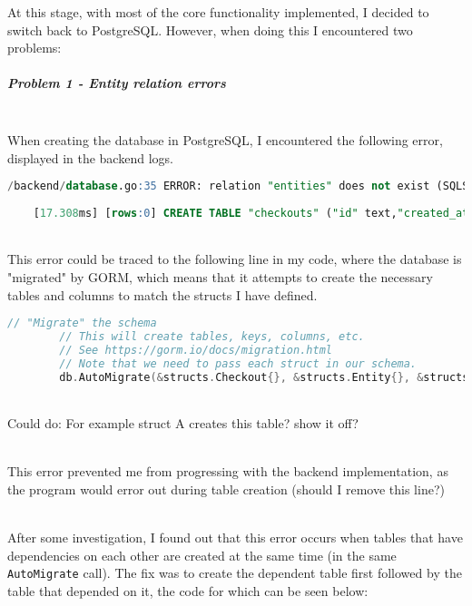 \documentclass[../../main.tex]{subfiles}
\begin{document}
\noindent At this stage, with most of the core functionality implemented, I decided to switch back to PostgreSQL. However, when doing this I encountered two problems:

\subparagraph{Problem 1 - Entity relation errors}

\noindent \\ When creating the database in PostgreSQL, I encountered the following error, displayed in the backend logs.

\begin{lstlisting}[language=SQL]
    /backend/database.go:35 ERROR: relation "entities" does not exist (SQLSTATE 42P01)
    
    [17.308ms] [rows:0] CREATE TABLE "checkouts" ("id" text,"created_at" timestamptz,"updated_at" timestamptz,"deleted_at" timestamptz,"take_date" timestamptz,"return_date" timestamptz,PRIMARY KEY ("id"),CONSTRAINT "fk_entities_checkouts" FOREIGN KEY ("id") REFERENCES "entities"("id"))
    \end{lstlisting}

\noindent \\ This error could be traced to the following line in my code, where the database is "migrated" by GORM, which means that it attempts to create the necessary tables and columns to match the structs I have defined.

\begin{lstlisting}[language=Go]
        // "Migrate" the schema
        // This will create tables, keys, columns, etc.
        // See https://gorm.io/docs/migration.html
        // Note that we need to pass each struct in our schema.
        db.AutoMigrate(&structs.Checkout{}, &structs.Entity{}, &structs.Item{}, &structs.User{})
    \end{lstlisting}

\noindent \\Could do: For example struct A creates this table? show it off?

\noindent \\ This error prevented me from progressing with the backend implementation, as the program would error out during table creation (should I remove this line?)

\noindent \\ After some investigation, I found out that this error occurs when tables that have dependencies on each other are created at the same time (in the same \lstinline{AutoMigrate} call). The fix was to create the dependent table first followed by the table that depended on it, the code for which can be seen below:
\end{document}
